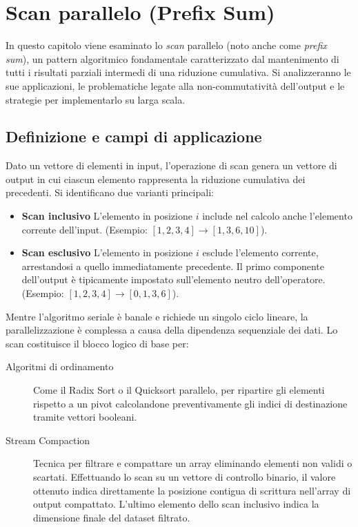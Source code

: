\chapter{Scan parallelo (Prefix Sum)}\label{chap:opencl_scan}

In questo capitolo viene esaminato lo \emph{scan} parallelo (noto anche come \emph{prefix sum}), un pattern algoritmico fondamentale caratterizzato dal mantenimento di tutti i risultati parziali intermedi di una riduzione cumulativa. Si analizzeranno le sue applicazioni, le problematiche legate alla non-commutatività dell'output e le strategie per implementarlo su larga scala.

\section{Definizione e campi di applicazione}\label{sec:scan_def}

Dato un vettore di elementi in input, l'operazione di scan genera un vettore di output in cui ciascun elemento rappresenta la riduzione cumulativa dei precedenti. Si identificano due varianti principali:
\begin{itemize}
    \item \textbf{Scan inclusivo} L'elemento in posizione $i$ include nel calcolo anche l'elemento corrente dell'input. (Esempio: $[1, 2, 3, 4] \rightarrow [1, 3, 6, 10]$).
    \item \textbf{Scan esclusivo} L'elemento in posizione $i$ esclude l'elemento corrente, arrestandosi a quello immediatamente precedente. Il primo componente dell'output è tipicamente impostato sull'elemento neutro dell'operatore. (Esempio: $[1, 2, 3, 4] \rightarrow [0, 1, 3, 6]$).
\end{itemize}

Mentre l'algoritmo seriale è banale e richiede un singolo ciclo lineare, la parallelizzazione è complessa a causa della dipendenza sequenziale dei dati. Lo scan costituisce il blocco logico di base per:
\begin{description}
    \item[Algoritmi di ordinamento] Come il Radix Sort o il Quicksort parallelo, per ripartire gli elementi rispetto a un pivot calcolandone preventivamente gli indici di destinazione tramite vettori booleani.
    \item[Stream Compaction] Tecnica per filtrare e compattare un array eliminando elementi non validi o scartati. Effettuando lo scan su un vettore di controllo binario, il valore ottenuto indica direttamente la posizione contigua di scrittura nell'array di output compattato. L'ultimo elemento dello scan inclusivo indica la dimensione finale del dataset filtrato.
\end{description}

